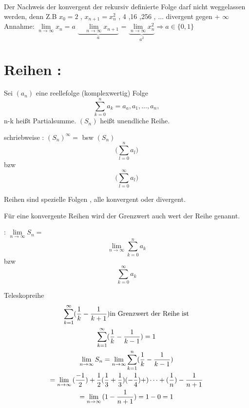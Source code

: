 \begin{remark}
	Der Nachweis der konvergent der rekursiv definierte Folge darf nicht weggelassen werden, denn Z.B $x_0=2$ , $x_{n+1}=x_n^2$ \quad \quad {} , 4 ,16 ,256 , $\dots $ divergent gegen + $\infty$  \\
	
	Annahme: $\lim\limits_{n \rightarrow \infty}{x_n}= a $ 
	$\underbrace{\quad \lim\limits_{n \rightarrow \infty}{x_{n+1}}}_{a}$ = 
	$\underbrace{\lim\limits_{n \rightarrow \infty}{x_n^2}}_{a^2} \Rightarrow a \in \{ 0,1 \}$
\end{remark}  


\newpage
\section{Reihen :}
\begin{definition}
	Sei $(a_n)$ eine reellefolge (komplexwertig) Folge\\
	$$\sum_{k = 0}^{n} {a_k} = a_a , a_1, \dots , a_n , $$
	n-k heißt Partialsumme.
	$(S_n)$ heißt unendliche Reihe.
	
	schriebweise : $(S_n)^\infty =$ bsw 
	$(S_n)$ $$ \bigg( \sum_{l=0}^{n} {a_l} \bigg)$$ bzw
	$$ \bigg( \sum_{l=0}^{\infty} {a_l} \bigg)$$  
\end{definition}

\begin{remark}
	Reihen sind spezielle Folgen , alle konvergent oder divergent. 
\end{remark}

\begin{definition}
	Für eine konvergente Reihen wird der Grenzwert auch wert der Reihe genannt.\\
	
	\begin{schreibweise}
		:  $\lim\limits_{n \rightarrow \infty}{S_n}= $
		$$\lim\limits_{n \rightarrow \infty}{ \sum_{k=0}^{n} {a_k} }  $$ 
		bzw 
		$$ \sum_{k=0}^{\infty} {a_k}  $$
	\end{schreibweise}
	
\end{definition}

\begin{example}{Teleskopreihe} 
	\begin{gather*}
	\sum_{k=1}^\infty(\frac{1}{k}-\frac{1}{k+1}) \text{in Grenzwert der Reihe ist}\\ 
	\sum_{k=1}^\infty(\frac{1}{k}-\frac{1}{k-1})=1 \\
	\lim_{n \to \infty}{S_n} = \lim_{n \to \infty}{\sum_{k=1}^n(\frac{1}{k}- \frac{1}{k-1}) }\\
	= \lim\limits_{n \rightarrow \infty}{(\frac{-1}{2})+\frac{1}{2}(\frac{1}{3} + \frac{1}{3})(-\frac{1}{4})+) \dots +(\frac{1}{n})-\frac{1}{n+1}}\\
	= \lim\limits_{n \rightarrow \infty}{(1- \frac{1}{n+1})}= 1-0 =1 
	\end{gather*}
\end{example}

